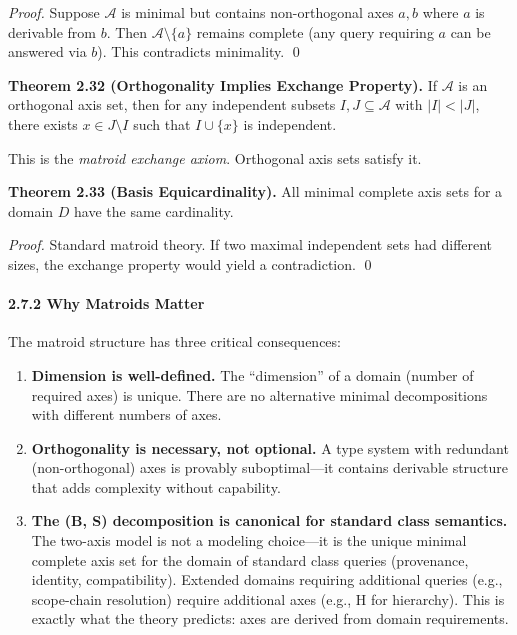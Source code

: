 \emph{Proof.} Suppose \(\mathcal{A}\) is minimal but contains non-orthogonal axes \(a, b\) where \(a\) is derivable from \(b\). Then \(\mathcal{A} \setminus \{a\}\) remains complete (any query requiring \(a\) can be answered via \(b\)). This contradicts minimality. \qed

\textbf{Theorem 2.32 (Orthogonality Implies Exchange Property).} If \(\mathcal{A}\) is an orthogonal axis set, then for any independent subsets \(I, J \subseteq \mathcal{A}\) with \(|I| < |J|\), there exists \(x \in J \setminus I\) such that \(I \cup \{x\}\) is independent.

This is the \emph{matroid exchange axiom}. Orthogonal axis sets satisfy it.

\textbf{Theorem 2.33 (Basis Equicardinality).} All minimal complete axis sets for a domain \(D\) have the same cardinality.

\emph{Proof.} Standard matroid theory. If two maximal independent sets had different sizes, the exchange property would yield a contradiction. \qed

\paragraph{2.7.2 Why Matroids Matter}\label{why-matroids-matter}

The matroid structure has three critical consequences:

\begin{enumerate}
\item \textbf{Dimension is well-defined.} The ``dimension'' of a domain (number of required axes) is unique. There are no alternative minimal decompositions with different numbers of axes.

\item \textbf{Orthogonality is necessary, not optional.} A type system with redundant (non-orthogonal) axes is provably suboptimal---it contains derivable structure that adds complexity without capability.

\item \textbf{The (B, S) decomposition is canonical for standard class semantics.} The two-axis model is not a modeling choice---it is the unique minimal complete axis set for the domain of standard class queries (provenance, identity, compatibility). Extended domains requiring additional queries (e.g., scope-chain resolution) require additional axes (e.g., H for hierarchy). This is exactly what the theory predicts: axes are derived from domain requirements.
\end{enumerate}

